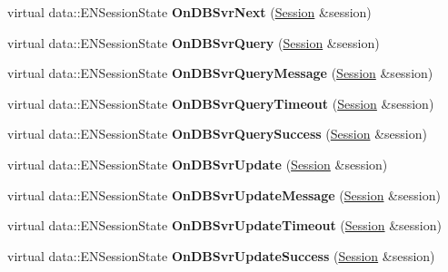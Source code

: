 \begin{DoxyCompactItemize}
\item 
\hypertarget{classBasicHandler_a7b03d753cc871c48afe97156c97ec811}{
virtual data::ENSessionState {\bfseries OnDBSvrNext} (\hyperlink{classSession}{Session} \&session)}
\label{classBasicHandler_a7b03d753cc871c48afe97156c97ec811}

\item 
\hypertarget{classBasicHandler_aad2f4384e709d830f780f730ca907897}{
virtual data::ENSessionState {\bfseries OnDBSvrQuery} (\hyperlink{classSession}{Session} \&session)}
\label{classBasicHandler_aad2f4384e709d830f780f730ca907897}

\item 
\hypertarget{classBasicHandler_a15566792077804c944534d906cbe7006}{
virtual data::ENSessionState {\bfseries OnDBSvrQueryMessage} (\hyperlink{classSession}{Session} \&session)}
\label{classBasicHandler_a15566792077804c944534d906cbe7006}

\item 
\hypertarget{classBasicHandler_a82515e8589882e8c6cd2742631d6e1c8}{
virtual data::ENSessionState {\bfseries OnDBSvrQueryTimeout} (\hyperlink{classSession}{Session} \&session)}
\label{classBasicHandler_a82515e8589882e8c6cd2742631d6e1c8}

\item 
\hypertarget{classBasicHandler_a0609c49b6b98a12eec784738fc378ca9}{
virtual data::ENSessionState {\bfseries OnDBSvrQuerySuccess} (\hyperlink{classSession}{Session} \&session)}
\label{classBasicHandler_a0609c49b6b98a12eec784738fc378ca9}

\item 
\hypertarget{classBasicHandler_a22cbe94f2de81195fefb5e01bfc365fd}{
virtual data::ENSessionState {\bfseries OnDBSvrUpdate} (\hyperlink{classSession}{Session} \&session)}
\label{classBasicHandler_a22cbe94f2de81195fefb5e01bfc365fd}

\item 
\hypertarget{classBasicHandler_a239e962b93c981e8a79f6928165bc9f9}{
virtual data::ENSessionState {\bfseries OnDBSvrUpdateMessage} (\hyperlink{classSession}{Session} \&session)}
\label{classBasicHandler_a239e962b93c981e8a79f6928165bc9f9}

\item 
\hypertarget{classBasicHandler_abe8a0f7f6d911d8c65f3fb1fc5fb695f}{
virtual data::ENSessionState {\bfseries OnDBSvrUpdateTimeout} (\hyperlink{classSession}{Session} \&session)}
\label{classBasicHandler_abe8a0f7f6d911d8c65f3fb1fc5fb695f}

\item 
\hypertarget{classBasicHandler_a77f57ae08abddd78bea53f80efca1a8a}{
virtual data::ENSessionState {\bfseries OnDBSvrUpdateSuccess} (\hyperlink{classSession}{Session} \&session)}
\label{classBasicHandler_a77f57ae08abddd78bea53f80efca1a8a}


\end{DoxyCompactItemize}
